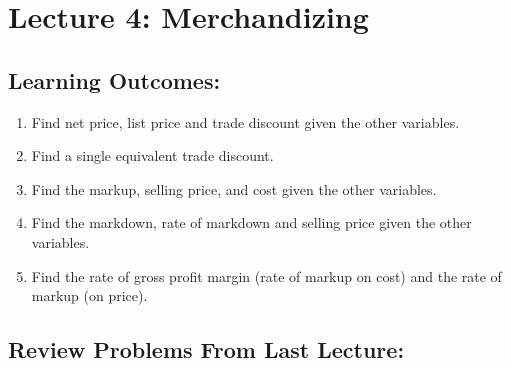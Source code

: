 \documentclass[
]{book}
\providecommand{\tightlist}{%
  \setlength{\itemsep}{0pt}\setlength{\parskip}{0pt}}
\begin{document}
\section*{Lecture 4: Merchandizing}\label{lecture-4-merchandizing}

\subsection*{Learning Outcomes:}\label{learning-outcomes-3}

\begin{enumerate}
\def\labelenumi{\arabic{enumi}.}
\tightlist
\item
  Find net price, list price and trade discount given the other variables.
\item
  Find a single equivalent trade discount.
\item
  Find the markup, selling price, and cost given the other variables.
\item
  Find the markdown, rate of markdown and selling price given the other variables.
\item
  Find the rate of gross profit margin (rate of markup on cost) and the rate of markup (on price).
\end{enumerate}

\subsection*{Review Problems From Last Lecture:}\label{review-problems-from-last-lecture-2}
\end{document}
